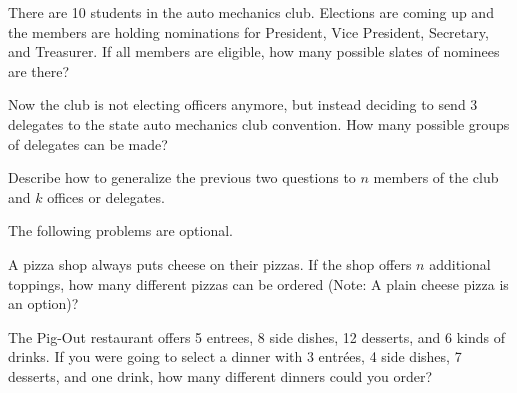 \begin{prob}
There are 10 students in the auto mechanics club.  Elections are
coming up and the members are holding nominations for President, Vice
President, Secretary, and Treasurer.  If all members are eligible,
how many possible slates of nominees are there?  
\end{prob}


\begin{prob}
Now the club is not electing officers anymore, but
instead deciding to send $3$ delegates to the state auto mechanics
club convention.  How many possible groups of delegates can be made?
\end{prob}

\begin{prob}
Describe how to generalize the previous two questions to $n$ members of the
 club and $k$ offices or delegates.
\end{prob}

\begin{teachingnote}
The following problems are optional.
\end{teachingnote}

\begin{prob}
A pizza shop always puts cheese on their pizzas.  If the shop offers
$n$ additional toppings, how many different pizzas can be ordered
(Note: A plain cheese pizza is an option)?
\end{prob}


\begin{prob}
The Pig-Out restaurant offers 5 entrees, 8 side dishes, 12 desserts,
and 6 kinds of drinks.  If you were going to select a dinner with 3
entr\'ees, 4 side dishes, 7 desserts, and one drink, how many
different dinners could you order?
\end{prob}
